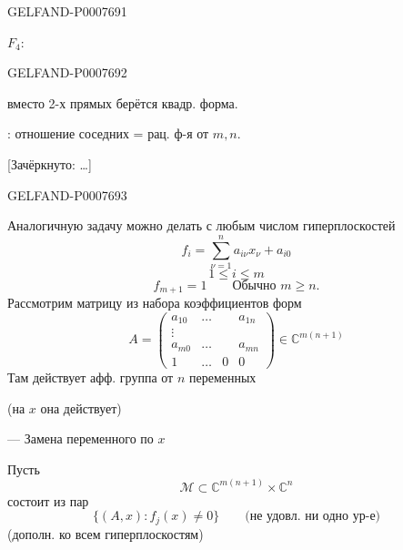 \begin{GelfandAdjacentEvidence}{GELFAND-P000769}{1}

\(F_4:\)
\end{GelfandAdjacentEvidence}
\begin{GelfandAdjacentEvidence}{GELFAND-P000769}{2}

вместо 2-х прямых берётся квадр. форма.


: отношение соседних = рац. ф-я от \(m,n\).

[Зачёркнуто: …]
\end{GelfandAdjacentEvidence}
\begin{GelfandAdjacentEvidence}{GELFAND-P000769}{3}

Аналогичную задачу можно делать с любым числом гиперплоскостей
\begin{equation*}
\tag{4}
f_i=\sum_{\nu=1}^{n}a_{i\nu}x_\nu+a_{i0}
\end{equation*}
\[
1\le i\le m
\]
\[
f_{m+1}=1\qquad\text{Обычно }m\ge n.
\]
Рассмотрим матрицу из набора коэффициентов форм
\begin{equation*}
\tag{5}
A=\begin{pmatrix}
a_{10}&\ldots&&a_{1n}\\
\vdots&&&\\
a_{m0}&\ldots&&a_{mn}\\
1&\ldots&0&0
\end{pmatrix}
\in\mathbb C^{m(n+1)}
\end{equation*}
Там действует афф. группа от \(n\) переменных

(на \(x\) она действует)

--- Замена переменного по \(x\)

Пусть
\[
\mathcal M\subset\mathbb C^{m(n+1)}\times\mathbb C^n
\]
состоит из пар
\[
\{(A,x):f_j(x)\ne0\}\qquad\text{(не удовл. ни одно ур-е)}
\]
(дополн. ко всем гиперплоскостям)

\end{GelfandAdjacentEvidence}
